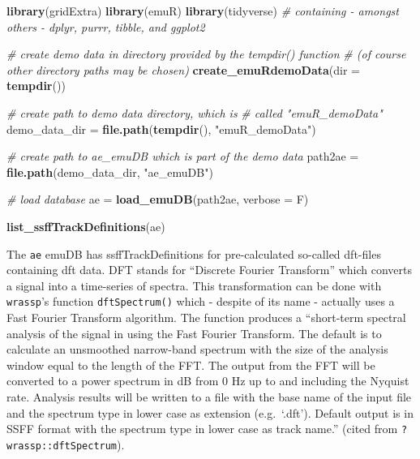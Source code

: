 \documentclass[]{book}
\newenvironment{Shaded}{\begin{snugshade}}{\end{snugshade}}
\newcommand{\CommentTok}[1]{\textcolor[rgb]{0.56,0.35,0.01}{\textit{#1}}}
\newcommand{\DataTypeTok}[1]{\textcolor[rgb]{0.13,0.29,0.53}{#1}}
\newcommand{\KeywordTok}[1]{\textcolor[rgb]{0.13,0.29,0.53}{\textbf{#1}}}
\newcommand{\NormalTok}[1]{#1}
\newcommand{\StringTok}[1]{\textcolor[rgb]{0.31,0.60,0.02}{#1}}
\begin{document}
\begin{Shaded}
\begin{Highlighting}[]
\KeywordTok{library}\NormalTok{(gridExtra)}
\KeywordTok{library}\NormalTok{(emuR)}
\KeywordTok{library}\NormalTok{(tidyverse) }\CommentTok{# containing - amongst others - dplyr, purrr, tibble, and ggplot2}

\CommentTok{# create demo data in directory provided by the tempdir() function}
\CommentTok{# (of course other directory paths may be chosen)}
\KeywordTok{create_emuRdemoData}\NormalTok{(}\DataTypeTok{dir =} \KeywordTok{tempdir}\NormalTok{())}

\CommentTok{# create path to demo data directory, which is}
\CommentTok{# called "emuR_demoData"}
\NormalTok{demo_data_dir =}\StringTok{ }\KeywordTok{file.path}\NormalTok{(}\KeywordTok{tempdir}\NormalTok{(), }\StringTok{"emuR_demoData"}\NormalTok{)}

\CommentTok{# create path to ae_emuDB which is part of the demo data}
\NormalTok{path2ae =}\StringTok{ }\KeywordTok{file.path}\NormalTok{(demo_data_dir, }\StringTok{"ae_emuDB"}\NormalTok{)}

\CommentTok{# load database}
\NormalTok{ae =}\StringTok{ }\KeywordTok{load_emuDB}\NormalTok{(path2ae, }\DataTypeTok{verbose =}\NormalTok{ F)}

\KeywordTok{list_ssffTrackDefinitions}\NormalTok{(ae)}
\end{Highlighting}
\end{Shaded}

The \texttt{ae} emuDB has ssffTrackDefinitions for pre-calculated so-called dft-files containing dft data. DFT stands for ``Discrete Fourier Transform'' which converts a signal into a time-series of spectra. This transformation can be done with \texttt{wrassp}'s function \texttt{dftSpectrum()} which - despite of its name - actually uses a Fast Fourier Transform algorithm. The function produces a ``short-term spectral analysis of the signal in using the Fast Fourier Transform. The default is to calculate an unsmoothed narrow-band spectrum with the size of the analysis window equal to the length of the FFT. The output from the FFT will be converted to a power spectrum in dB from 0 Hz up to and including the Nyquist rate. Analysis results will be written to a file with the base name of the input file and the spectrum type in lower case as extension (e.g.~`.dft'). Default output is in SSFF format with the spectrum type in lower case as track name.'' (cited from \texttt{?wrassp::dftSpectrum}).
\end{document}
